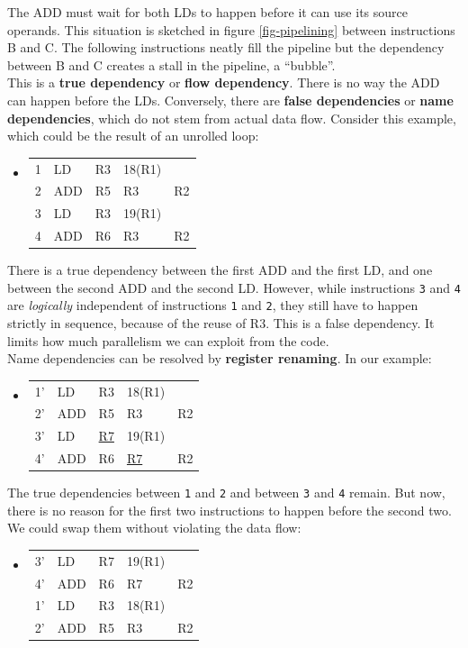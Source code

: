 \documentclass[12pt,a4paper]{article} %
\newenvironment {assembly}{\begingroup \ttfamily \color{Gray} \begin{itemize} \item[]}{\end{itemize}\endgroup}
\begin{document}
The ADD must wait for both LDs to happen before it can use its source operands. This situation is sketched in figure \ref{fig-pipelining} between instructions B and C. The following instructions neatly fill the pipeline but the dependency between B and C creates a stall in the pipeline, a ``bubble''.\\
This is a \textbf{true dependency} or \textbf{flow dependency}. There is no way the ADD can happen before the LDs. Conversely, there are \textbf{false dependencies} or \textbf{name dependencies}, which do not stem from actual data flow. Consider this example, which could be the result of an unrolled loop:
\begin{assembly}
	\begin{tabularx} {\textwidth} {n o a a X}
		1 & LD  & R3 & 18(R1)	& \\
		2 & ADD & R5 & R3		& R2\\
		3 & LD  & R3 & 19(R1)	& \\
		4 & ADD & R6 & R3		& R2\\
	\end{tabularx}
\end{assembly}
There is a true dependency between the first ADD and the first LD, and one between the second ADD and the second LD. However, while instructions \texttt{3} and \texttt{4} are \textit{logically} independent of instructions \texttt{1} and \texttt{2}, they still have to happen strictly in sequence, because of the reuse of R3. This is a false dependency. It limits how much parallelism we can exploit from the code.\\ 
\newpage
Name dependencies can be resolved by \textbf{register renaming}. In our example:
\begin{assembly}
	\begin{tabularx} {\textwidth} {n o a a X}
		1' & LD  & R3 & 18(R1)	& \\
		2' & ADD & R5 & R3		& R2\\
		3' & LD  & \underline{R7} & 19(R1)	& \\
		4' & ADD & R6 & \underline{R7}		& R2\\
	\end{tabularx}
\end{assembly}
The true dependencies between \texttt{1} and \texttt{2} and between \texttt{3} and \texttt{4} remain. But now, there is no reason for the first two instructions to happen before the second two. We could swap them without violating the data flow:
\begin{assembly}
	\begin{tabularx} {\textwidth} {n o a a X}
		3' & LD  & R7 & 19(R1)	& \\
		4' & ADD & R6 & R7		& R2\\
		1' & LD  & R3 & 18(R1)	& \\
		2' & ADD & R5 & R3		& R2\\
	\end{tabularx}
\end{assembly}
\end{document}
